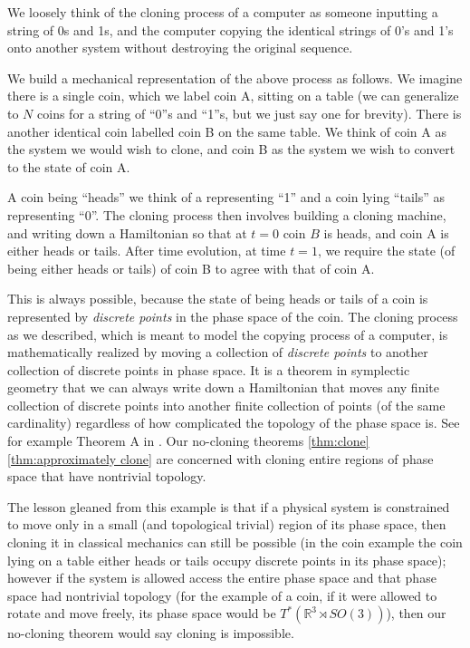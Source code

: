 \documentclass[jmp,amsmath,amssymb]{revtex4-1}
\theoremstyle{plain}
\begin{document}
We loosely think of the cloning process of a computer as someone inputting a string of 0s and 1s, and the computer copying the identical strings of 0's and 1's onto another system without destroying the original sequence. 

We build a mechanical representation of the above process as follows. We imagine there is a single coin, which we label coin A, sitting on a table (we can generalize to $N$ coins for a string of ``0''s and ``1''s, but we just say one for brevity). There is another identical coin labelled coin B on the same table. We think of coin A as the system we would wish to clone, and coin B as the system we wish to convert to the state of coin A. 

A coin being ``heads'' we think of a representing ``1'' and a coin lying ``tails'' as representing ``0''. The cloning process then involves building a cloning machine, and writing down a Hamiltonian so that at $t=0$ coin $B$ is heads, and coin A is either heads or tails. After time evolution, at time $t=1$, we require the state (of being either heads or tails) of coin B to agree with that of coin A.

This is always possible, because the state of being heads or tails of a coin is represented by \emph{discrete points} in the phase space of the coin. The cloning process as we described, which is meant to model the copying process of a computer, is mathematically realized by moving a collection of \emph{discrete points} to another collection of discrete points in phase space. It is a theorem in symplectic geometry that we can always write down a Hamiltonian that moves any finite collection of discrete points into another finite collection of points (of the same cardinality) regardless of how complicated the topology of the phase space is. See for example Theorem A in \cite{transitivegroup}. Our no-cloning theorems \ref{thm:clone} \ref{thm:approximately clone} are concerned with cloning entire regions of phase space that have nontrivial topology. 

The lesson gleaned from this example is that if a physical system is constrained to move only in a small (and topological trivial) region of its phase space, then cloning it in classical mechanics can still be possible (in the coin example the coin lying on a table either heads or tails occupy discrete points in its phase space); however if the system is allowed access the entire phase space and that phase space had nontrivial topology (for the example of a coin, if it were allowed to rotate and move freely, its phase space would be $T^*(\mathbb{R}^3 \rtimes SO(3))$), then our no-cloning theorem would say cloning is impossible.
\end{document}
